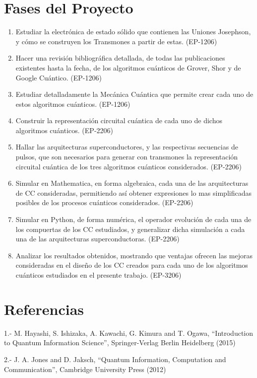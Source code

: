 \section{Fases del Proyecto}

\begin{enumerate}
    \item Estudiar la electrónica de estado sólido que contienen las Uniones Josephson, y cómo se construyen los Transmones a partir de estas. (EP-1206)
    \item Hacer una revisión bibliográfica detallada, de todas las publicaciones existentes hasta la fecha, de los algoritmos cuánticos de Grover, Shor y de Google Cuántico. (EP-1206)
    \item Estudiar detalladamente la Mecánica Cuántica que permite crear cada uno de estos algoritmos cuánticos. (EP-1206)
    \item Construir la representación circuital cuántica de cada uno de dichos algoritmos cuánticos. (EP-2206)
    \item Hallar las arquitecturas superconductores, y las respectivas secuencias de pulsos, que son necesarios para generar con transmones la representación circuital cuántica de los tres algoritmos cuánticos considerados. (EP-2206)
    \item Simular en Mathematica, en forma algebraica, cada una de las arquitecturas de CC consideradas, permitiendo así obtener expresiones lo mas simplificadas posibles de los procesos cuánticos considerados. (EP-2206)
    \item Simular en Python, de forma numérica, el operador evolución de cada una de los compuertas de los CC estudiados, y generalizar dicha simulación a cada una de las arquitecturas superconductoras. (EP-2206)
    \item Analizar los resultados obtenidos, mostrando que ventajas ofrecen las mejoras consideradas en el diseño de los CC creados para cada uno de los algoritmos cuánticos estudiados en el presente trabajo. (EP-3206)
\end{enumerate}


\section{Referencias}

1.- M. Hayashi, S. Ishizaka, A. Kawachi, G. Kimura and T. Ogawa, “Introduction to Quantum Information Science”, Springer-Verlag Berlin Heidelberg (2015)

2.- J. A. Jones and D. Jaksch, “Quantum Information, Computation and Communication”, Cambridge University Press (2012)


